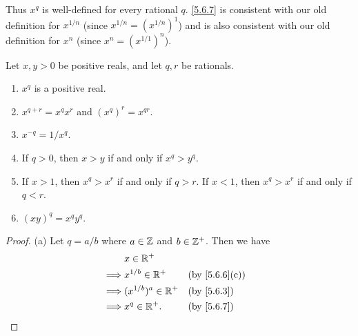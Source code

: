 \begin{note}
  Thus \(x^q\) is well-defined for every rational \(q\).
  \cref{5.6.7} is consistent with our old definition for \(x^{1 / n}\) (since \(x^{1 / n} = (x^{1 / n})^1\)) and is also consistent with our old definition for \(x^n\) (since \(x^n = (x^{1 / 1})^n\)).
\end{note}

\begin{lem}\label{5.6.9}
  Let \(x, y > 0\) be positive reals, and let \(q, r\) be rationals.
  \begin{enumerate}
    \item \(x^q\) is a positive real.
    \item \(x^{q + r} = x^q x^r\) and \((x^q)^r = x^{qr}\).
    \item \(x^{-q} = 1 / x^q\).
    \item If \(q > 0\), then \(x > y\) if and only if \(x^q > y^q\).
    \item If \(x > 1\), then \(x^q > x^r\) if and only if \(q > r\).
          If \(x < 1\), then \(x^q > x^r\) if and only if \(q < r\).
    \item \((xy)^q = x^q y^q\).
  \end{enumerate}
\end{lem}

\begin{proof}{(a)}
  Let \(q = a / b\) where \(a \in \mathbb{Z}\) and \(b \in \mathbb{Z}^+\).
  Then we have
  \begin{align*}
             & x \in \R^+                                              \\
    \implies & x^{1 / b} \in \R^+     &  & \text{(by \cref{5.6.6}(c))} \\
    \implies & (x^{1 / b})^a \in \R^+ &  & \text{(by \cref{5.6.3})}    \\
    \implies & x^q \in \R^+.          &  & \text{(by \cref{5.6.7})}
  \end{align*}
\end{proof}


